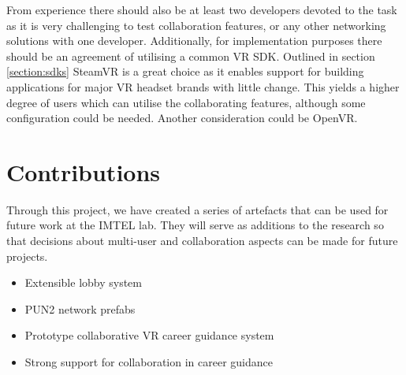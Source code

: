 From experience there should also be at least two developers devoted to the task as it is very challenging to test collaboration features, or any other networking solutions with one developer. Additionally, for implementation purposes there should be an agreement of utilising a common VR SDK. Outlined in section \ref{section:sdks} SteamVR is a great choice as it enables support for building applications for major VR headset brands with little change. This yields a higher degree of users which can utilise the collaborating features, although some configuration could be needed. Another consideration could be OpenVR.







\section{Contributions}

Through this project, we have created a series of artefacts that can be used for future work at the IMTEL lab.  They will serve as additions to the research so that decisions about multi-user and collaboration aspects can be made for future projects.   

\begin{itemize}
    \item Extensible lobby system
    \item PUN2 network prefabs
    \item Prototype collaborative VR career guidance system
    \item Strong support for collaboration in career guidance
\end{itemize}





